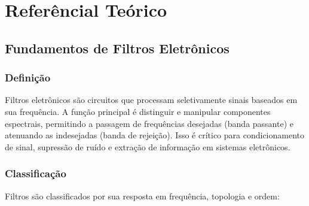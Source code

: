 \section{Referêncial Teórico}

\subsection{Fundamentos de Filtros Eletrônicos}

\subsubsection{Definição}
Filtros eletrônicos são circuitos que processam seletivamente sinais baseados em sua frequência. A função principal é distinguir e manipular componentes espectrais, permitindo a passagem de frequências desejadas (banda passante) e atenuando as indesejadas (banda de rejeição). Isso é crítico para condicionamento de sinal, supressão de ruído e extração de informação em sistemas eletrônicos.

\subsubsection{Classificação}
Filtros são classificados por sua resposta em frequência, topologia e ordem:


